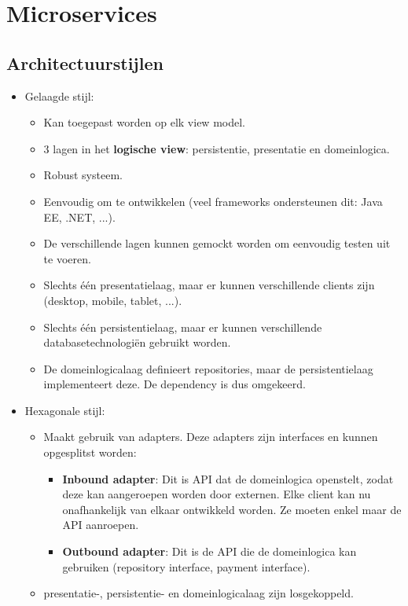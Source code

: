 \documentclass{report}
\begin{document}
	\part{Microservices}
	\chapter{Architectuurstijlen}
	\begin{itemize}
		\item[\info] Gelaagde stijl:
		\begin{itemize}
			\item[\info] Kan toegepast worden op elk view model.
			\item[\info] 3 lagen in het \textbf{logische view}: persistentie, presentatie en domeinlogica.
			\item[\good] Robust systeem.
			\item[\good] Eenvoudig om te ontwikkelen (veel frameworks ondersteunen dit: Java EE, .NET, ...).
			\item[\good] De verschillende lagen kunnen gemockt worden om eenvoudig testen uit te voeren.
			\item[\alert] Slechts één presentatielaag, maar er kunnen verschillende clients zijn (desktop, mobile, tablet, ...).
			\item[\alert] Slechts één persistentielaag, maar er kunnen verschillende databasetechnologiën gebruikt worden.
			\item[\alert] De domeinlogicalaag definieert repositories, maar de persistentielaag implementeert deze. De dependency is dus omgekeerd.
		\end{itemize}
		\item[\info] Hexagonale stijl:
		\begin{itemize}
			\item[\info] Maakt gebruik van adapters. Deze adapters zijn interfaces en kunnen opgesplitst worden:
			\begin{itemize}
				\item[\info] \textbf{Inbound adapter}: Dit is API dat de domeinlogica openstelt, zodat deze kan aangeroepen worden door externen. Elke client kan nu onafhankelijk van elkaar ontwikkeld worden. Ze moeten enkel maar de API aanroepen.
				\item[\info] \textbf{Outbound adapter}: Dit is de API die de domeinlogica kan gebruiken (repository interface, payment interface).
			\end{itemize}
			\item[\good] presentatie-, persistentie- en domeinlogicalaag zijn losgekoppeld.

\end{itemize}
\end{itemize}
\end{document}
